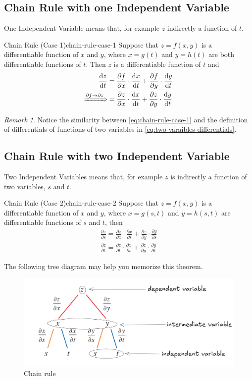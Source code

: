 \documentclass[math,code]{amznotes}
\theoremstyle{remark}
\newtheorem*{remark}{Remark}
\begin{document}
\subsection{Chain Rule with one Independent Variable}
One Independent Variable means that, for example $z$ indirectly a function of $t$.
\begin{thmbox}{Chain Rule (Case 1)}{chain-rule-case-1}
    Suppose that $z=f(x,y)$ is a differentiable function of $x$ and $y$, where $x=g(t)$ and $y=h(t)$ are both differentiable functions of $t$. Then $z$ is a differentiable function of $t$ and
    \begin{align} 
        \frac{\mathrm d z}{\mathrm d t}&=\frac{\partial f}{\partial x}\cdot \frac{\mathrm d x}{\mathrm d t}+\frac{\partial f}{\partial y}\cdot \frac{\mathrm d y}{\mathrm d t} \label{eq:chain-rule-case-1} \\ 
        \xRightarrow{\partial f \to \partial z} &= \frac{\partial z}{\partial x}\cdot\frac{\mathrm d x}{\mathrm d t} +\frac{\partial z}{\partial y}\cdot \frac{\mathrm d y}{\mathrm d t}
    \end{align}
\end{thmbox}
\begin{notebox}
    \begin{remark}
        Notice the similarity between \eqref{eq:chain-rule-case-1} and the definition of differentials of functions of two variables in \eqref{eq:two-varaibles-differentials}.
    \end{remark}
\end{notebox}
\subsection{Chain Rule with two Independent Variable}
Two Independent Variables means that, for example $z$ is indirectly a function of two variables, $s$ and $t$.
\begin{thmbox}{Chain Rule (Case 2)}{chain-rule-case-2}
    Suppose that $z=f(x,y)$ is a differentiable function of $x$ and $y$, where $x=g(s,t)$ and $y=h(s,t)$ are differentiable functions of $s$ and $t$, then
    \begin{gather*}
        \frac{\partial z}{\partial s}=\frac{\partial z}{\partial x} \cdot \frac{\partial x}{\partial s} + \frac{\partial z}{\partial y} \cdot \frac{\partial y}{\partial s} \\
        \frac{\partial z}{\partial t}=\frac{\partial z}{\partial t} \cdot \frac{\partial x}{\partial t} + \frac{\partial z}{\partial y} \cdot \frac{\partial y}{\partial t}
    \end{gather*}
\end{thmbox}
The following tree diagram may help you memorize this theorem.
\begin{figure}[H]
    \centering
    \includegraphics[width=0.5\linewidth]{images/chain-rule.png}
    \caption{Chain rule}
    \label{fig:chain-rule}
\end{figure}
\end{document}
